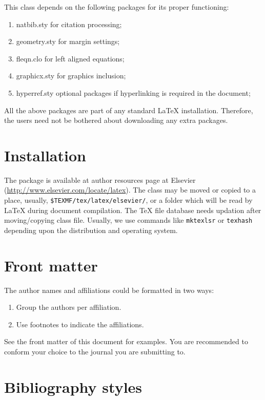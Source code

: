 \documentclass[a4paper,fleqn]{cas-sc}
\begin{document}
This class depends on the following packages
for its proper functioning:

\begin{enumerate}
\itemsep=0pt
\item {natbib.sty} for citation processing;
\item {geometry.sty} for margin settings;
\item {fleqn.clo} for left aligned equations;
\item {graphicx.sty} for graphics inclusion;
\item {hyperref.sty} optional packages if hyperlinking is
  required in the document;
\end{enumerate}  

All the above packages are part of any
standard \LaTeX{} installation.
Therefore, the users need not be
bothered about downloading any extra packages.

\section{Installation}

The package is available at author resources page at Elsevier
(\url{http://www.elsevier.com/locate/latex}).
The class may be moved or copied to a place, usually,
\verb+$TEXMF/tex/latex/elsevier/+, %
or a folder which will be read                   
by \LaTeX{} during document compilation.  The \TeX{} file
database needs updation after moving/copying class file.  Usually,
we use commands like \verb+mktexlsr+ or \verb+texhash+ depending
upon the distribution and operating system.

\section{Front matter}

The author names and affiliations could be formatted in two ways:
\begin{enumerate}[(1)]
\item Group the authors per affiliation.
\item Use footnotes to indicate the affiliations.
\end{enumerate}
See the front matter of this document for examples. 
You are recommended to conform your choice to the journal you 
are submitting to.

\section{Bibliography styles}
\end{document}
